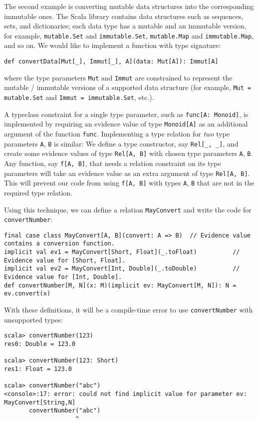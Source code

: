 The second example is converting mutable data structures into the
corresponding immutable ones. The Scala library contains data structures
such as sequences, sets, and dictionaries; each data type has a mutable
and an immutable version, for example, \lstinline!mutable.Set! and
\lstinline!immutable.Set!, \lstinline!mutable.Map! and \lstinline!immutable.Map!,
and so on. We would like to implement a function with type signature:
\begin{lstlisting}
def convertData[Mut[_], Immut[_], A](data: Mut[A]): Immut[A]
\end{lstlisting}
where the type parameters \lstinline!Mut! and \lstinline!Immut!
are constrained to represent the mutable / immutable versions of a
supported data structure (for example, \lstinline!Mut = mutable.Set!
and \lstinline!Immut = immutable.Set!, etc.).

A typeclass constraint for a single type parameter, such as \lstinline!func[A: Monoid]!,
is implemented by requiring an evidence value
of type \lstinline!Monoid[A]! as an additional argument of the function
\lstinline!func!. Implementing a type relation for \emph{two} type
parameters \lstinline!A!, \lstinline!B! is similar: We define a
type constructor, say \lstinline!Rel[_, _]!, and create some evidence
values of type \lstinline!Rel[A, B]! with chosen type parameters
\lstinline!A!, \lstinline!B!. Any function, say \lstinline!f[A, B]!,
that needs a relation constraint on its type parameters will take
an evidence value as an extra argument of type \lstinline!Rel[A, B]!.
This will prevent our code from using \lstinline!f[A, B]! with types
\lstinline!A!, \lstinline!B! that are not in the required type relation. 

Using this technique, we can define a relation \lstinline!MayConvert!
and write the code for \lstinline!convertNumber!:
\begin{lstlisting}
final case class MayConvert[A, B](convert: A => B)  // Evidence value contains a conversion function.
implicit val ev1 = MayConvert[Short, Float](_.toFloat)          // Evidence value for [Short, Float].
implicit val ev2 = MayConvert[Int, Double](_.toDouble)          // Evidence value for [Int, Double].
def convertNumber[M, N](x: M)(implicit ev: MayConvert[M, N]): N = ev.convert(x)
\end{lstlisting}
With these definitions, it will be a compile-time error to use \lstinline!convertNumber!
with unsupported types:
\begin{lstlisting}
scala> convertNumber(123)
res0: Double = 123.0

scala> convertNumber(123: Short)
res1: Float = 123.0

scala> convertNumber("abc")
<console>:17: error: could not find implicit value for parameter ev: MayConvert[String,N]
       convertNumber("abc")
                    ^
\end{lstlisting}

